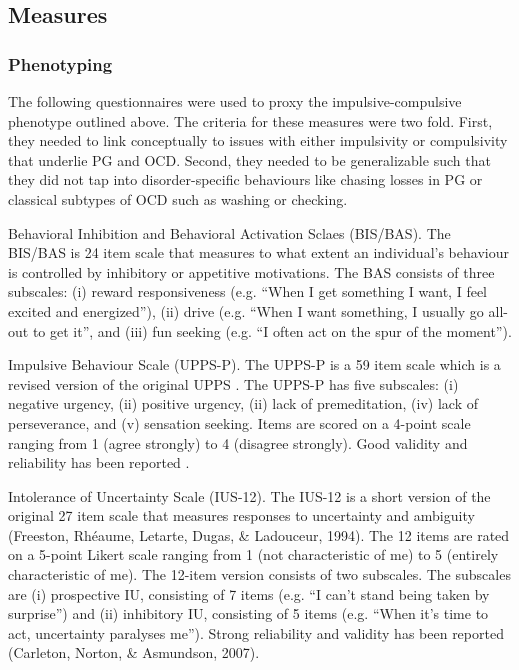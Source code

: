 \subsection{Measures}

\subsubsection{Phenotyping}
	
The following questionnaires were used to proxy the impulsive-compulsive phenotype outlined above. The criteria for these measures were two fold. First, they needed to link conceptually to issues with either impulsivity or compulsivity that underlie PG and OCD. Second, they needed to be generalizable such that they did not tap into disorder-specific behaviours like chasing losses in PG or classical subtypes of OCD such as washing or checking.

Behavioral Inhibition and Behavioral Activation Sclaes (BIS/BAS). The BIS/BAS \cite{Carver_1994} is 24 item scale that measures to what extent an individual’s behaviour is controlled by inhibitory or appetitive motivations. The BAS consists of three subscales: (i) reward responsiveness (e.g. “When I get something I want, I feel excited and energized”), (ii) drive (e.g. “When I want something, I usually go all-out to get it”, and (iii) fun seeking (e.g. “I often act on the spur of the moment”).

Impulsive Behaviour Scale (UPPS-P). The UPPS-P \cite{Cyders_2007} is a 59 item scale which is a revised version of the original UPPS \cite{Whiteside_2005}.  The UPPS-P has five subscales: (i) negative urgency, (ii) positive urgency, (ii) lack of premeditation, (iv) lack of perseverance, and (v) sensation seeking. Items are scored on a 4-point scale ranging from 1 (agree strongly) to 4 (disagree strongly). Good validity and reliability has been reported \cite{Whiteside_2005,Cyders_2007}.

Intolerance of Uncertainty Scale (IUS-12). The IUS-12 is a short version of the original 27 item scale that measures responses to uncertainty and ambiguity (Freeston, Rhéaume, Letarte, Dugas, & Ladouceur, 1994).  The 12 items are rated on a 5-point Likert scale ranging from 1 (not characteristic of me) to 5 (entirely characteristic of me). The 12-item version consists of two subscales. The subscales are (i) prospective IU, consisting of 7 items (e.g. “I can’t stand being taken by surprise”) and (ii) inhibitory IU, consisting of 5 items (e.g. “When it’s time to act, uncertainty paralyses me”).  Strong reliability and validity has been reported (Carleton, Norton, & Asmundson, 2007).

